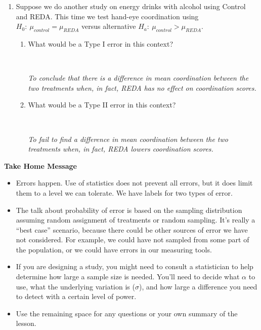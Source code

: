 \begin{enumerate}
\begin{key}
  {\it  Type II = 1--power so we want more than 90\% power.  Need 43
      people. }
\end{key}
\item Suppose we do another study on energy drinks with alcohol using
  Control and REDA.  This time we test hand-eye coordination using
  $H_0:\ \mu_{control} = \mu_{REDA}$ versus alternative  $H_a:\
  \mu_{control} > \mu_{REDA}$.
  \begin{enumerate}
  \item What would be a Type I error in this context? 
\begin{students}
 \vspace{1cm}\\
\end{students}

\begin{key}
  {\it   To conclude that there is a difference in mean coordination between the
    two treatments when, in fact, REDA has no effect on coordination scores. }
\end{key}
  \item What would be a Type II error in this context? 
\begin{students}
 \vspace{1cm}\\
\end{students}

\begin{key}
  {\it  To fail to find a difference in mean coordination between the
    two treatments when, in fact, REDA lowers coordination scores. }
\end{key}
  \end{enumerate}

\end{enumerate}


\begin{center}
  {\bf Take Home Message} \vspace{-.6cm}
\end{center}
\begin{itemize}
  \item Errors happen.  Use of statistics does not prevent all errors,
    but it does limit them to a level we can tolerate. We have labels
    for two types of error.
  \item The talk about probability of  error is based on the sampling
    distribution assuming random assignment of treatments or random
    sampling. It's really a ``best case'' scenario, because there
    could be other sources of error we have not considered.  For
    example, we could have not sampled from some part of the
    population, or we could have errors in our measuring tools.
  \item If you are designing a study, you might need to consult a
    statistician to help determine how large a sample size is
    needed. You'll need to decide what $\alpha$ to use, what the
    underlying variation is ($\sigma$), and how large a difference you
    need to detect with a certain level of power.
 \item 
  Use the remaining space for any questions or your own summary of the
  lesson. 
\end{itemize}

